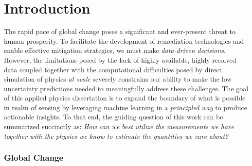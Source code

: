 \chapter{Introduction}


The rapid pace of global change poses a significant and ever-present threat to human prosperity. To facilitate the development of remediation technologies and enable effective mitigation strategies, we must make \textit{data-driven decisions}. However, the limitations posed by the lack of highly available, highly resolved data coupled together with the computational difficulties posed by direct simulation of physics \textit{at scale} severely constrains our ability to make the low uncertainty predictions needed to meaningfully address these challenges. The goal of this applied physics dissertation is to expand the boundary of what is possible in realm of sensing by leveraging machine learning in a \textit{principled way} to produce actionable insights. To that end, the guiding question of this work can be summarized succinctly as: \textit{How can we best utilize the measurements we have together with the physics we know to estimate the quantities we care about?}


\subsection{Global Change}


\subsection{}

